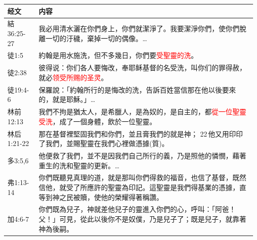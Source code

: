 \begin{table}[H]
\centering
 \begin{tabular}{p{6em}|p{40em}}  \toprule
经文&内容\\  \midrule
結36:25-27&我必用清水灑在你們身上，你們就潔淨了。我要潔淨你們，使你們脫離一切的汙穢，棄掉一切的偶像。…\\  \midrule
徒1:5&約翰是用水施洗，但不多幾日，你們要\textcolor{red}{受聖靈的洗}。\\  \midrule
徒2:38&彼得说：你们各人要悔改，奉耶稣基督的名受洗，叫你们的罪得赦，就必\textcolor{red}{领受所赐的圣灵}。\\  \midrule

徒19:4-6&保羅說：「約翰所行的是悔改的洗，告訴百姓當信那在他以後要來的，就是耶穌。」…\\  \midrule
林前12:13&我們不拘是猶太人，是希臘人，是為奴的，是自主的，都\textcolor{red}{從一位聖靈受洗}，成了一個身體，飲於一位聖靈。\\  \midrule
林后1:21-22&那在基督裡堅固我們和你們，並且膏我們的就是神； 22 他又用印印了我們，並賜聖靈在我們心裡做憑據(質)。\\  \midrule
多3:5,6&他便救了我們，並不是因我們自己所行的義，乃是照他的憐憫，藉著重生的洗和聖靈的更新。…\\  \midrule
弗1:13-14&你們既聽見真理的道，就是那叫你們得救的福音，也信了基督，既然信他，就受了所應許的聖靈為印記。這聖靈是我們得基業的憑據，直等到神之民被贖，使他的榮耀得著稱讚。\\  \midrule
加4:6-7&你們既為兒子，神就差他兒子的靈進入你們的心，呼叫：「阿爸！父！」可見，從此以後你不是奴僕，乃是兒子了；既是兒子，就靠著神為後嗣。\\  \midrule


\end{tabular}
\end{table}
